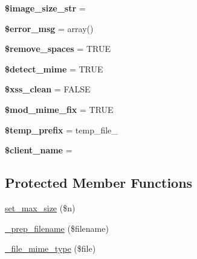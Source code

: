 \begin{DoxyCompactItemize}
\item 
\mbox{\label{class_c_i___upload_a2697cd2a0dad313937e906635361a240}} 
{\bfseries \$image\+\_\+size\+\_\+str} = \textquotesingle{}\textquotesingle{}
\item 
\mbox{\label{class_c_i___upload_a6576b90669f133cfb04193ce4b160b82}} 
{\bfseries \$error\+\_\+msg} = array()
\item 
\mbox{\label{class_c_i___upload_a8f0f589696f882db1abcca54ae3c409f}} 
{\bfseries \$remove\+\_\+spaces} = T\+R\+UE
\item 
\mbox{\label{class_c_i___upload_a990980ecf6fd1347f32b4f71d5ff20ef}} 
{\bfseries \$detect\+\_\+mime} = T\+R\+UE
\item 
\mbox{\label{class_c_i___upload_ab7f81cc9565445db4950422e8e2ab7a5}} 
{\bfseries \$xss\+\_\+clean} = F\+A\+L\+SE
\item 
\mbox{\label{class_c_i___upload_a5eb0376bbc3f81d69f382a93d1d3d2ad}} 
{\bfseries \$mod\+\_\+mime\+\_\+fix} = T\+R\+UE
\item 
\mbox{\label{class_c_i___upload_afcad1904ff21a7b85861a3fac3351877}} 
{\bfseries \$temp\+\_\+prefix} = \textquotesingle{}temp\+\_\+file\+\_\+\textquotesingle{}
\item 
\mbox{\label{class_c_i___upload_a9a8de506962bb68b32bc573f6c14d076}} 
{\bfseries \$client\+\_\+name} = \textquotesingle{}\textquotesingle{}
\end{DoxyCompactItemize}
\subsection*{Protected Member Functions}
\begin{DoxyCompactItemize}
\item 
\mbox{\hyperlink{class_c_i___upload_afb4d99be805b31bb404905c09b14f158}{set\+\_\+max\+\_\+size}} (\$n)
\item 
\mbox{\hyperlink{class_c_i___upload_a9392dbfb099708e0867a08baeb108ec0}{\+\_\+prep\+\_\+filename}} (\$filename)
\item 
\mbox{\hyperlink{class_c_i___upload_a25b07a1451cfbaa708ebcef47943ce55}{\+\_\+file\+\_\+mime\+\_\+type}} (\$file)
\end{DoxyCompactItemize}
